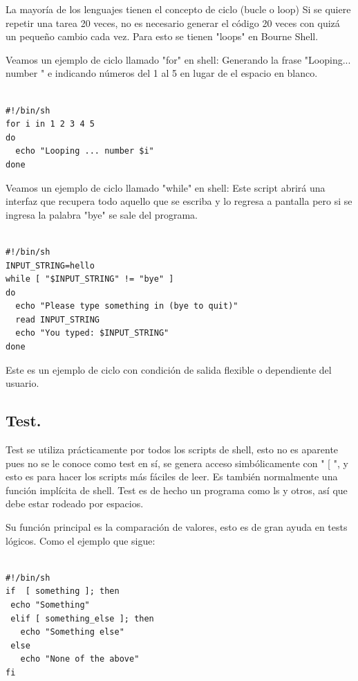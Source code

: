 \documentclass{article} %
\begin{document}
La mayoría de los lenguajes tienen el concepto de ciclo (bucle o loop) Si se quiere repetir una tarea 20 veces, no es necesario generar el código 20 veces con quizá un pequeño cambio cada vez. Para esto se tienen "loops" en Bourne Shell. 

\vspace{0.5 cm}

Veamos un ejemplo de ciclo llamado "for" en shell: Generando la frase "Looping... number  " e indicando números del 1 al 5 en lugar de el espacio en blanco. 

\begin{verbatim} 

#!/bin/sh
for i in 1 2 3 4 5
do
  echo "Looping ... number $i"
done

\end{verbatim}

Veamos un ejemplo de ciclo llamado "while" en shell: Este script abrirá una interfaz que recupera todo aquello que se escriba y lo regresa a pantalla pero si se ingresa la palabra "bye" se sale del programa.

\begin{verbatim} 

#!/bin/sh
INPUT_STRING=hello
while [ "$INPUT_STRING" != "bye" ]
do
  echo "Please type something in (bye to quit)"
  read INPUT_STRING
  echo "You typed: $INPUT_STRING"
done

\end{verbatim}

Este es un ejemplo de ciclo con condición de salida flexible o dependiente del usuario.

\subsection{Test.}

Test se utiliza prácticamente por todos los scripts de shell, esto no es aparente pues no se le conoce como test en sí, se genera acceso simbólicamente con " [ ", y esto es para hacer los scripts más fáciles de leer.  Es también normalmente una función implícita de shell. Test es de hecho un programa como ls y otros, así que debe estar rodeado por espacios.

Su función principal es la comparación de valores, esto es de gran ayuda en tests lógicos. Como el ejemplo que sigue:

\begin{verbatim} 

#!/bin/sh
if  [ something ]; then
 echo "Something"
 elif [ something_else ]; then
   echo "Something else"
 else
   echo "None of the above"
fi

\end{verbatim}
\end{document}

